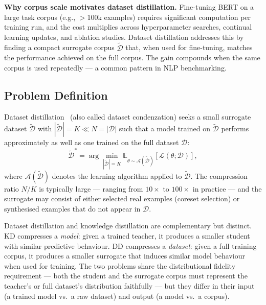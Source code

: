 \begin{foldable}
  \textbf{Why corpus scale motivates dataset distillation.}
  Fine-tuning BERT on a large task corpus (e.g., $>$100k examples) requires significant computation per training run, and the cost multiplies across hyperparameter searches, continual learning updates, and ablation studies.
  Dataset distillation addresses this by finding a compact surrogate corpus $\tilde{\mathcal{D}}$ that, when used for fine-tuning, matches the performance achieved on the full corpus.
  The gain compounds when the same corpus is used repeatedly --- a common pattern in NLP benchmarking.
\end{foldable}

\subsection{Problem Definition}
\label{sec:26-background-datasetdistillation-definition}

\begin{foldable}
  Dataset distillation~\cite{zhao2020dataset} (also called dataset condenzation) seeks a small surrogate dataset $\tilde{\mathcal{D}}$ with $|\tilde{\mathcal{D}}| = K \ll N = |\mathcal{D}|$ such that a model trained on $\tilde{\mathcal{D}}$ performs approximately as well as one trained on the full dataset $\mathcal{D}$:
  \begin{equation}
    \tilde{\mathcal{D}}^{*} = \arg\min_{|\tilde{\mathcal{D}}|=K}
    \mathbb{E}_{\theta \sim \mathcal{A}(\tilde{\mathcal{D}})}\!\left[\mathcal{L}(\theta; \mathcal{D})\right],
    \label{eq:dd-objective}
  \end{equation}
  where $\mathcal{A}(\tilde{\mathcal{D}})$ denotes the learning algorithm applied to $\tilde{\mathcal{D}}$.
  The compression ratio $N/K$ is typically large --- ranging from $10\times$ to $100\times$ in practice --- and the surrogate may consist of either selected real examples (coreset selection) or synthesised examples that do not appear in $\mathcal{D}$.
\end{foldable}

\begin{foldable}
  Dataset distillation and knowledge distillation are complementary but distinct. KD compresses a \emph{model}: given a trained teacher, it produces a smaller student with similar predictive behaviour.
  DD compresses a \emph{dataset}: given a full training corpus, it produces a smaller surrogate that induces similar model behaviour when used for training.
  The two problems share the distributional fidelity requirement --- both the student and the surrogate corpus must represent the teacher's or full dataset's distribution faithfully --- but they differ in their input (a trained model vs.\ a raw dataset) and output (a model vs.\ a corpus).
\end{foldable}

